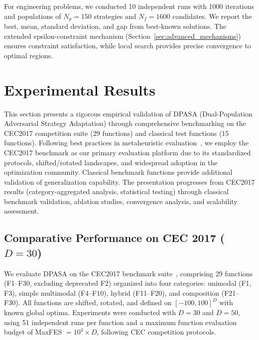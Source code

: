 \documentclass[11pt]{article}
\begin{document}
For engineering problems, we conducted 10 independent runs with 1000 iterations and populations of $N_p = 150$ strategies and $N_f = 1600$ candidates. We report the best, mean, standard deviation, and gap from best-known solutions. The extended epsilon-constraint mechanism (Section~\ref{sec:advanced_mechanisms}) ensures constraint satisfaction, while local search provides precise convergence to optimal regions.




\section{Experimental Results}
\label{sec:results}

This section presents a rigorous empirical validation of DPASA (Dual-Population Adversarial Strategy Adaptation) through comprehensive benchmarking on the CEC2017 competition suite (29 functions) and classical test functions (15 functions). Following best practices in metaheuristic evaluation~\citep{derrac2011practical}, we employ the CEC2017 benchmark as our primary evaluation platform due to its standardized protocols, shifted/rotated landscapes, and widespread adoption in the optimization community. Classical benchmark functions provide additional validation of generalization capability. The presentation progresses from CEC2017 results (category-aggregated analysis, statistical testing) through classical benchmark validation, ablation studies, convergence analysis, and scalability assessment.

\subsection{Comparative Performance on CEC 2017 ($D=30$)}
\label{sec:cec2017_primary}

We evaluate DPASA on the CEC2017 benchmark suite~\citep{awad2017cec}, comprising 29 functions (F1--F30, excluding deprecated F2) organized into four categories: unimodal (F1, F3), simple multimodal (F4--F10), hybrid (F11--F20), and composition (F21--F30). All functions are shifted, rotated, and defined on $[-100, 100]^D$ with known global optima. Experiments were conducted with $D=30$ and $D=50$, using 51 independent runs per function and a maximum function evaluation budget of MaxFES $= 10^4 \times D$, following CEC competition protocols.
\end{document}

